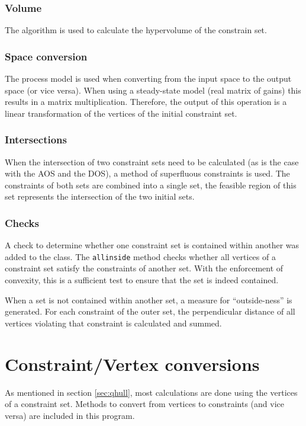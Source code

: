 \subsubsection{Volume}
The \qhull algorithm is used to calculate the hypervolume of the constrain set.

\subsubsection{Space conversion}
The process model is used when converting from the input space to the output space (or vice versa).
When using a steady-state model (real matrix of gains) this results in a matrix multiplication.
Therefore, the output of this operation is a linear transformation of the vertices of the initial constraint set.  

\subsubsection{Intersections}
When the intersection of two constraint sets need to be calculated (as is the case with the AOS and the DOS), a method of superfluous constraints is used.
The constraints of both sets are combined into a single set, the feasible region of this set represents the intersection of the two initial sets.

\subsubsection{Checks}
A check to determine whether one constraint set is contained within another was added to the class.
The \texttt{allinside} method checks whether all vertices of a constraint set satisfy the constraints of another set.
With the enforcement of convexity, this is a sufficient test to ensure that the set is indeed contained.

When a set is not contained within another set, a measure for ``outside-ness'' is generated.
For each constraint of the outer set, the perpendicular distance of all vertices violating that constraint is calculated and summed.

\section{Constraint/Vertex conversions}\label{sec:con2vert}
As mentioned in section \ref{sec:qhull}, most calculations are done using the vertices of a constraint set.
Methods to convert from vertices to constraints (and vice versa) are included in this program.

